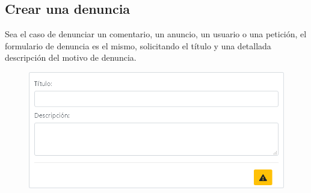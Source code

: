 \subsection{Crear una denuncia}
Sea el caso de denunciar un comentario, un anuncio, un usuario o una petici\'{o}n, el formulario de denuncia es el mismo, solicitando el t\'{i}tulo y una detallada descripci\'{o}n del motivo de denuncia. 

\begin{figure}[h!]
\centering
\includegraphics[width=.5\textwidth]{Img/ManualUsuario/DENUNCIA.png}
\end{figure}




